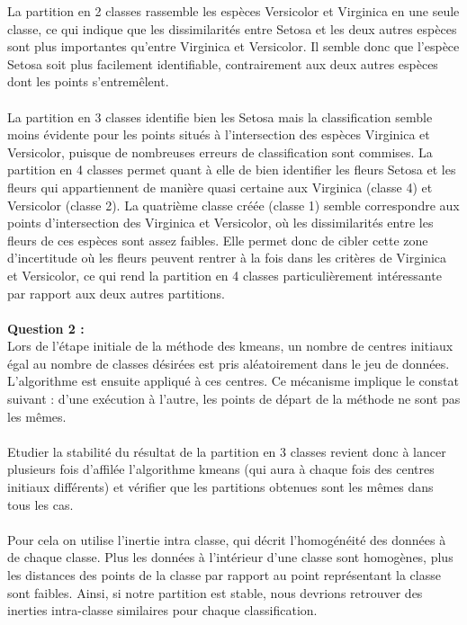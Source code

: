 \documentclass[a4paper, 10pt]{article}
\begin{document}
La partition en 2 classes rassemble les espèces Versicolor et Virginica en une seule classe,
ce qui indique que les dissimilarités entre Setosa et les deux autres espèces sont plus importantes qu'entre Virginica et Versicolor.
Il semble donc que l'espèce Setosa soit plus facilement identifiable, contrairement aux deux autres espèces dont les points s'entremêlent.\\ \\
La partition en 3 classes identifie bien les Setosa mais la classification semble moins évidente
pour les points situés à l'intersection des espèces Virginica et Versicolor, puisque de nombreuses erreurs de classification sont commises.
\newpage
\noindent
La partition en 4 classes permet quant à elle de bien identifier les fleurs Setosa et les fleurs qui appartiennent de manière
quasi certaine aux Virginica (classe 4) et Versicolor (classe 2).
La quatrième classe créée (classe 1) semble correspondre aux points d'intersection des Virginica et Versicolor,
où les dissimilarités entre les fleurs de ces espèces sont assez faibles.
Elle permet donc de cibler cette zone d'incertitude où les fleurs peuvent rentrer à la fois dans les critères de Virginica et Versicolor,
ce qui rend la partition en 4 classes particulièrement intéressante par rapport aux deux autres partitions.\\ \\
\textbf{Question 2 :}\\
Lors de l'étape initiale de la méthode des kmeans, un nombre de centres initiaux égal
au nombre de classes désirées est pris aléatoirement dans le jeu de données. L’algorithme est ensuite appliqué à ces centres.
Ce mécanisme implique le constat suivant : d’une exécution à l’autre, les points de départ de la méthode ne sont pas les mêmes.\\ \\
Etudier la stabilité du résultat de la partition en 3 classes revient donc à lancer plusieurs fois
d’affilée l’algorithme kmeans (qui aura à chaque fois des centres initiaux différents) et vérifier que les
partitions obtenues sont les mêmes dans tous les cas.\\ \\
Pour cela on utilise l'inertie intra classe, qui décrit l'homogénéité des données à de chaque classe.
Plus les données à l’intérieur d'une classe sont homogènes,
plus les distances des points de la classe par rapport au point représentant la classe sont faibles.
Ainsi, si notre partition est stable, nous devrions retrouver des inerties intra-classe similaires pour chaque classification.\\ \\
\end{document}
